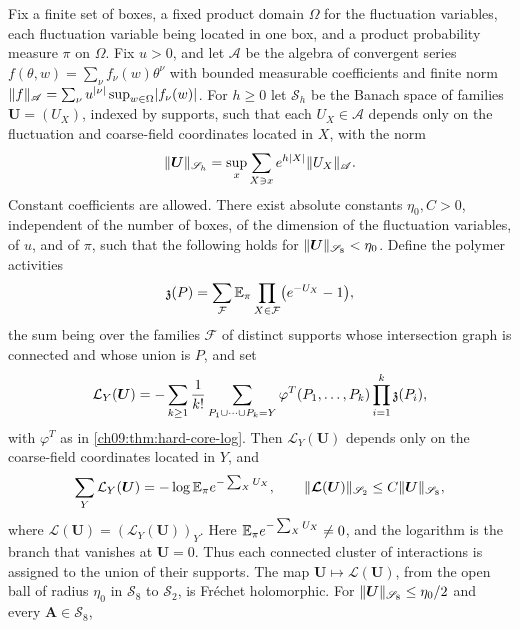 \begin{theorem}\label{ch09:thm:supported-log-holomorphy}
Fix a finite set of boxes, a fixed product domain $\Omega$ for the fluctuation variables, each fluctuation variable being located in one box, and a product probability measure $\pi$ on $\Omega$. Fix $u>0$, and let $\mathscr A$ be the algebra of convergent series $f(\theta,w)=\sum_\nu f_\nu(w)\theta^\nu$ with bounded measurable coefficients and finite norm $\lVert f\rVert_{\mathscr A}=\sum_\nu u^{\lvert \nu\rvert}\sup_{w\in\Omega}\lvert f_\nu(w)\rvert$. For $h\ge0$ let $\mathscr S_h$ be the Banach space of families $\boldsymbol U=(U_X)$, indexed by supports, such that each $U_X\in\mathscr A$ depends only on the fluctuation and coarse-field coordinates located in $X$, with the norm
\[
 \lVert \boldsymbol U\rVert_{\mathscr S_h}=\sup_x\sum_{X\ni x}e^{h\lvert X\rvert}\lVert U_X\rVert_{\mathscr A}.
\]
Constant coefficients are allowed. There exist absolute constants $\eta_0,C>0$, independent of the number of boxes, of the dimension of the fluctuation variables, of $u$, and of $\pi$, such that the following holds for $\lVert \boldsymbol U\rVert_{\mathscr S_8}<\eta_0$. Define the polymer activities
\begin{equation}\label{ch09:eq:activity-formula}
 \mathfrak z(P)=\sum_{\mathcal F}\mathbb E_\pi\prod_{X\in\mathcal F}\bigl(e^{-U_X}-1\bigr),
\end{equation}
the sum being over the families $\mathcal F$ of distinct supports whose intersection graph is connected and whose union is $P$, and set
\[
 \mathcal L_Y(\boldsymbol U)=-\sum_{k\ge1}\frac1{k!}\sum_{P_1\cup\cdots\cup P_k=Y}\varphi^T(P_1,\ldots,P_k)\prod_{i=1}^k\mathfrak z(P_i),
\]
with $\varphi^T$ as in \cref{ch09:thm:hard-core-log}. Then $\mathcal L_Y(\boldsymbol U)$ depends only on the coarse-field coordinates located in $Y$, and
\begin{equation}\label{ch09:eq:supported-log-family-bound}
 \sum_Y\mathcal L_Y(\boldsymbol U)=-\log\mathbb E_\pi e^{-\sum_XU_X},\qquad
 \lVert \boldsymbol{\mathcal L}(\boldsymbol U)\rVert_{\mathscr S_2}\le C\lVert \boldsymbol U\rVert_{\mathscr S_8},
\end{equation}
where $\boldsymbol{\mathcal L}(\boldsymbol U)=(\mathcal L_Y(\boldsymbol U))_Y$. Here $\mathbb E_\pi e^{-\sum_XU_X}\ne0$, and the logarithm is the branch that vanishes at $\boldsymbol U=0$. Thus each connected cluster of interactions is assigned to the union of their supports. The map $\boldsymbol U\mapsto\boldsymbol{\mathcal L}(\boldsymbol U)$, from the open ball of radius $\eta_0$ in $\mathscr S_8$ to $\mathscr S_2$, is Fréchet holomorphic. For $\lVert \boldsymbol U\rVert_{\mathscr S_8}\le\eta_0/2$ and every $\boldsymbol A\in\mathscr S_8$,

\end{theorem}

